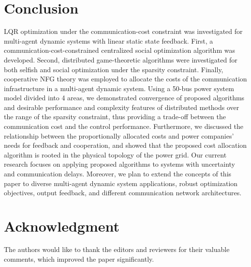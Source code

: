 \documentclass[12pt, draftclsnofoot,onecolumn]{IEEEtran}
\begin{document}
																									















\section{Conclusion}

LQR optimization under the communication-cost constraint was investigated for multi-agent dynamic systems with linear static state feedback. First, a communication-cost-constrained centralized social optimization algorithm was developed. Second, distributed game-theoretic algorithms were investigated for both selfish and social optimization under the sparsity constraint. Finally, cooperative NFG theory was employed to allocate the costs of the communication infrastructure in a multi-agent dynamic system. Using a 50-bus power system model divided into 4 areas, we demonstrated convergence of proposed algorithms and desirable performance and complexity features of distributed methods over the range of the sparsity constraint, thus providing a trade-off between the communication cost and the control performance. Furthermore, we discussed the relationship between the proportionally allocated costs and power companies' needs for feedback and cooperation, and showed that the proposed cost allocation algorithm is rooted in the physical topology of the power grid. Our current research focuses on applying proposed algorithms to systems with uncertainty and communication delays. Moreover, we plan to extend the concepts of this paper to diverse multi-agent dynamic system applications, robust optimization objectives, output feedback, and different communication network architectures.





















\section*{Acknowledgment}
The authors would like to thank the editors and reviewers for their valuable comments, which improved the paper significantly.
\end{document}
